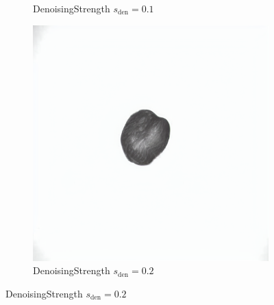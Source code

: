 \documentclass[12pt,DIV14,BCOR12mm,a4paper,footinclude=false,headinclude,parskip=half-,twoside,openright,cleardoublepage=empty,toc=index,bibliography=totoc,listof=totoc]{scrreprt}
\numberwithin{equation}{chapter}
\begin{document}
\begin{figure}
\begin{subfigure}[t]{0.23\textwidth}
        \caption{Denoising\hspace{0.2em}Strength $s_{\text{den}} = 0.1$}
    \end{subfigure}
    \begin{subfigure}[t]{0.23\textwidth} %
        \centering
        \includegraphics[width=\linewidth]{../media/image_0.2.png} %
        \caption{Denoising\hspace{0.2em}Strength $s_{\text{den}} = 0.2$}
    \end{subfigure}
    

\end{figure}
\end{document}
